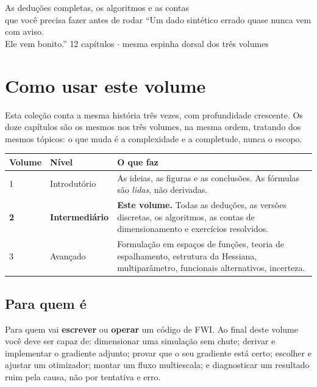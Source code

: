 \documentclass[11pt,a4paper,oneside]{report}
\begin{document}
\capafwi
{As dedu\c{c}\~oes completas, os algoritmos e as contas\\que voc\^e precisa
fazer antes de rodar}
{``Um dado sint\'etico errado quase nunca vem com aviso.\\Ele vem bonito.''}
{12 cap\'itulos $\cdot$ mesma espinha dorsal dos tr\^es volumes}

\tableofcontents
\cleardoublepage

\chapter*{Como usar este volume}

Esta cole\c{c}\~ao conta a mesma hist\'oria tr\^es vezes, com profundidade
crescente. Os doze cap\'itulos s\~ao os mesmos nos tr\^es volumes, na mesma
ordem, tratando dos mesmos t\'opicos: o que muda \'e a complexidade e a
completude, nunca o escopo.

\begin{center}
\begin{tabular}{@{}llp{7.4cm}@{}}
\toprule
\textbf{Volume} & \textbf{N\'ivel} & \textbf{O que faz} \\
\midrule
1 & Introdut\'orio & As ideias, as figuras e as conclus\~oes. As f\'ormulas
s\~ao \emph{lidas}, n\~ao derivadas. \\
\textbf{2} & \textbf{Intermedi\'ario} & \textbf{Este volume.} Todas as
dedu\c{c}\~oes, as vers\~oes discretas, os algoritmos, as contas de
dimensionamento e exerc\'icios resolvidos. \\
3 & Avan\c{c}ado & Formula\c{c}\~ao em espa\c{c}os de fun\c{c}\~oes, teoria de
espalhamento, estrutura da Hessiana, multipar\^ametro, funcionais
alternativos, incerteza. \\
\bottomrule
\end{tabular}
\end{center}

\section*{Para quem \'e}

Para quem vai \textbf{escrever} ou \textbf{operar} um c\'odigo de FWI. Ao
final deste volume voc\^e deve ser capaz de: dimensionar uma simula\c{c}\~ao
sem chute; derivar e implementar o gradiente adjunto; provar que o seu
gradiente est\'a certo; escolher e ajustar um otimizador; montar um fluxo
multiescala; e diagnosticar um resultado ruim pela causa, n\~ao por tentativa
e erro.
\end{document}
